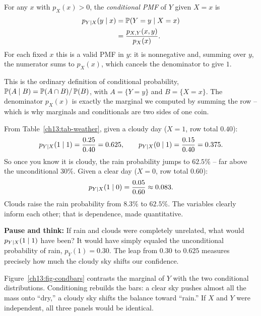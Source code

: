 \begin{definition}
\label{ch13:def-cond-pmf}
For any $x$ with $p_X(x) > 0$, the \emph{conditional PMF} of $Y$ given $X=x$ is
\begin{align*}
  p_{Y\mid X}(y \mid x)
  &= \operatorname{\mathbb{P}}(Y=y \mid X=x) \\
  &= \frac{p_{X,Y}(x,y)}{p_X(x)}.
\end{align*}
For each fixed $x$ this is a valid PMF in $y$: it is nonnegative and, summing
over $y$, the numerator sums to $p_X(x)$, which cancels the denominator to give
$1$.
\end{definition}

This is the ordinary definition of conditional probability,
$\operatorname{\mathbb{P}}(A\mid B)=\operatorname{\mathbb{P}}(A\cap B)/\operatorname{\mathbb{P}}(B)$, with $A=\{Y=y\}$ and $B=\{X=x\}$. The
denominator $p_X(x)$ is exactly the marginal we computed by summing the row --
which is why marginals and conditionals are two sides of one coin.

\begin{example}
\label{ch13:ex-rain-given-cloud}
From Table~\ref{ch13:tab-weather}, given a cloudy day ($X=1$, row total $0.40$):
\[
  p_{Y\mid X}(1 \mid 1) = \frac{0.25}{0.40} = 0.625,
  \qquad
  p_{Y\mid X}(0 \mid 1) = \frac{0.15}{0.40} = 0.375.
\]
So once you know it is cloudy, the rain probability jumps to $62.5\%$ -- far
above the unconditional $30\%$. Given a clear day ($X=0$, row total $0.60$):
\[
  p_{Y\mid X}(1 \mid 0) = \frac{0.05}{0.60} \approx 0.083 .
\]
Clouds raise the rain probability from $8.3\%$ to $62.5\%$. The variables clearly
inform each other; that is dependence, made quantitative.

\textbf{Pause and think:} If rain and clouds were completely unrelated, what would
$p_{Y\mid X}(1\mid 1)$ have been? It would have simply equaled the unconditional
probability of rain, $p_Y(1) = 0.30$. The leap from $0.30$ to $0.625$ measures
precisely how much the cloudy sky shifts our confidence.
\end{example}

Figure~\ref{ch13:fig-condbars} contrasts the marginal of $Y$ with the two
conditional distributions. Conditioning rebuilds the bars: a clear sky pushes
almost all the mass onto ``dry,'' a cloudy sky shifts the balance toward ``rain.''
If $X$ and $Y$ were independent, all three panels would be identical.

